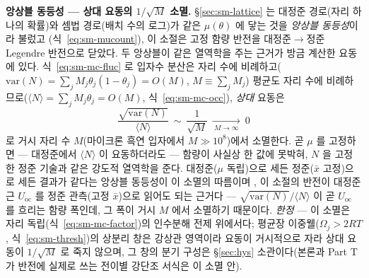 
\begin{bgbox}
\textbf{앙상블 동등성 --- 상대 요동의 $1/\sqrt{M}$ 소멸.} \S\ref{sec:sm-lattice} 는 대정준 경로(자리 하나의
확률)와 셈법 경로(배치 수의 로그)가 같은 $\mu(\theta)$ 에 닿는 것을 \emph{앙상블 동등성}이라 불렀고
(식~\eqref{eq:sm-mucount}), 이 소절은 고정 함량 반전을 대정준$\to$정준 Legendre 반전으로 닫았다. 두 앙상블이
같은 열역학을 주는 근거가 방금 계산한 요동에 있다. 식~\eqref{eq:sm-mc-fluc} 로 입자수 분산은 자리 수에
비례하고($\mathrm{var}(N)=\sum_jM_j\theta_j(1-\theta_j)=O(M)$, $M\equiv\sum_jM_j$) 평균도 자리 수에
비례하므로($\langle N\rangle=\sum_jM_j\theta_j=O(M)$, 식~\eqref{eq:sm-mc-occ}), \emph{상대} 요동은
\[
\frac{\sqrt{\mathrm{var}(N)}}{\langle N\rangle}\ \sim\ \frac{1}{\sqrt{M}}
\ \xrightarrow[\ M\to\infty\ ]{}\ 0
\]
로 거시 자리 수 $M$(마이크론 흑연 입자에서 $M\gg10^{8}$)에서 소멸한다. 곧 $\mu$ 를 고정하면 --- 대정준에서
$\langle N\rangle$ 이 요동하더라도 --- 함량이 사실상 한 값에 못박혀, $N$ 을 고정한 정준 기술과 같은 강도적
열역학을 준다. 대정준($\mu$ 독립)으로 세든 정준($\bar x$ 고정)으로 세든 결과가 같다는 앙상블 동등성이 이
소멸의 따름이며 \cite{hill1960,mcquarrie1976}, 이 소절의 반전이 대정준 근 $U_\mathrm{oc}$ 를 정준 관측(고정
$\bar x$)으로 읽어도 되는 근거다 --- $\sqrt{\mathrm{var}(N)}/\langle N\rangle$ 이 곧 $U_\mathrm{oc}$ 를
흐리는 함량 폭인데, 그 폭이 거시 $M$ 에서 소멸하기 때문이다. \emph{한정} --- 이 소멸은 자리
독립(식~\eqref{eq:sm-mc-factor})의 인수분해 전제 위에서다; 평균장 이중웰($\Omega_j>2RT$,
식~\eqref{eq:sm-thresh})의 상분리 창은 강상관 영역이라 요동이 거시적으로 자라 상대 요동이 $1/\sqrt{M}$ 로 죽지
않으며, 그 창의 분기 구성은 \S\ref{sec:hys} 소관이다(본론과 Part T 가 반전에 실제로 쓰는 전이별 강단조
서식은 이 소멸 안).
\end{bgbox}


